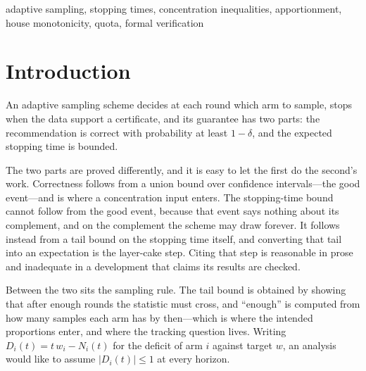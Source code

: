 \documentclass[conference]{IEEEtran}
\theoremstyle{definition}
\begin{document}
\begin{abstract}
Seven online rules are then compared, four of them classical apportionment divisor methods,
and the comparison corrects a claim this paper previously made: Jefferson's rule violates the
deficit bound on none of the targets, so the failure is not common to every rule. An eighth
rule settles the stronger question: Balinski and Young's quota method, which is
house-monotone and within quota by construction, violates neither bound on any of the
$32{,}018$ targets, so the obstruction is not integrality but this rule. Two further
measurements locate the constant. Lifting the denominator limit that the census had been
pinned against raises the worst deficit at eight arms from $\tfrac74$ to $\tfrac{307}{160}$,
and the worst over twenty arms is $\tfrac{321}{160}$---a plateau at about two, far below the
$K-1$ the literature proves, so a bound linear in the arm count is the wrong shape for what
this rule does.
\end{abstract}

\begin{IEEEkeywords}
adaptive sampling, stopping times, concentration inequalities, apportionment,
house monotonicity, quota, formal verification
\end{IEEEkeywords}

\section{Introduction}

An adaptive sampling scheme decides at each round which arm to sample, stops when the data
support a certificate, and its guarantee has two parts: the recommendation is correct with
probability at least $1-\delta$, and the expected stopping time is bounded.

The two parts are proved differently, and it is easy to let the first do the second's work.
Correctness follows from a union bound over confidence intervals---the good event---and is
where a concentration input enters. The stopping-time bound cannot follow from the good event,
because that event says nothing about its complement, and on the complement the scheme may
draw forever. It follows instead from a tail bound on the stopping time itself, and converting
that tail into an expectation is the layer-cake step. Citing that step is reasonable in prose
and inadequate in a development that claims its results are checked.

Between the two sits the sampling rule. The tail bound is obtained by showing that after
enough rounds the statistic must cross, and ``enough'' is computed from how many samples each
arm has by then---which is where the intended proportions enter, and where the tracking
question lives. Writing $D_{i}(t)=t\,w_{i}-N_{i}(t)$ for the deficit of arm $i$ against target
$w$, an analysis would like to assume $|D_{i}(t)|\le1$ at every horizon.
\end{document}
